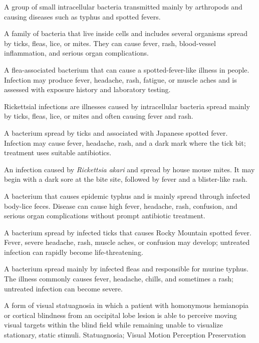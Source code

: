  A group of small intracellular bacteria transmitted mainly by arthropods and causing diseases such as typhus and spotted fevers.

 A family of bacteria that live inside cells and includes several organisms spread by ticks, fleas, lice, or mites. They can cause fever, rash, blood-vessel inflammation, and serious organ complications.

 A flea-associated bacterium that can cause a spotted-fever-like illness in people. Infection may produce fever, headache, rash, fatigue, or muscle aches and is assessed with exposure history and laboratory testing.

 Rickettsial infections are illnesses caused by intracellular bacteria spread mainly by ticks, fleas, lice, or mites and often causing fever and rash.

 A bacterium spread by ticks and associated with Japanese spotted fever. Infection may cause fever, headache, rash, and a dark mark where the tick bit; treatment uses suitable antibiotics.

 An infection caused by \textit{Rickettsia akari} and spread by house mouse mites. It may begin with a dark sore at the bite site, followed by fever and a blister-like rash.

 A bacterium that causes epidemic typhus and is mainly spread through infected body-lice feces. Disease can cause high fever, headache, rash, confusion, and serious organ complications without prompt antibiotic treatment.

 A bacterium spread by infected ticks that causes Rocky Mountain spotted fever. Fever, severe headache, rash, muscle aches, or confusion may develop; untreated infection can rapidly become life-threatening.

 A bacterium spread mainly by infected fleas and responsible for murine typhus. The illness commonly causes fever, headache, chills, and sometimes a rash; untreated infection can become severe.

 A form of visual statuagnosia in which a patient with homonymous hemianopia or cortical blindness from an occipital lobe lesion is able to perceive moving visual targets within the blind field while remaining unable to visualize stationary, static stimuli.
\synonyms
Statuagnosia; Visual Motion Perception Preservation

